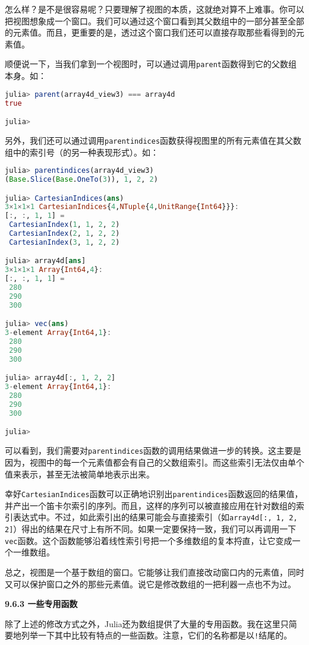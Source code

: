怎么样？是不是很容易呢？只要理解了视图的本质，这就绝对算不上难事。你可以把视图想象成一个窗口。我们可以通过这个窗口看到其父数组中的一部分甚至全部的元素值。而且，更重要的是，透过这个窗口我们还可以直接存取那些看得到的元素值。

顺便说一下，当我们拿到一个视图时，可以通过调用\verb|parent|函数得到它的父数组本身。如：
\begin{lstlisting}[language=julia]
julia> parent(array4d_view3) === array4d
true

julia> 
\end{lstlisting}

另外，我们还可以通过调用\verb|parentindices|函数获得视图里的所有元素值在其父数组中的索引号（的另一种表现形式）。如：

\begin{lstlisting}[language=julia]
julia> parentindices(array4d_view3)
(Base.Slice(Base.OneTo(3)), 1, 2, 2)

julia> CartesianIndices(ans)
3×1×1×1 CartesianIndices{4,NTuple{4,UnitRange{Int64}}}:
[:, :, 1, 1] =
 CartesianIndex(1, 1, 2, 2)
 CartesianIndex(2, 1, 2, 2)
 CartesianIndex(3, 1, 2, 2)

julia> array4d[ans]
3×1×1×1 Array{Int64,4}:
[:, :, 1, 1] =
 280
 290
 300

julia> vec(ans)
3-element Array{Int64,1}:
 280
 290
 300

julia> array4d[:, 1, 2, 2]
3-element Array{Int64,1}:
 280
 290
 300

julia> 
\end{lstlisting}

可以看到，我们需要对\verb|parentindices|函数的调用结果做进一步的转换。这主要是因为，视图中的每一个元素值都会有自己的父数组索引。而这些索引无法仅由单个值来表示，甚至无法被简单地表示出来。

幸好\verb|CartesianIndices|函数可以正确地识别出\verb|parentindices|函数返回的结果值，并产出一个笛卡尔索引的序列。而且，这样的序列可以被直接应用在针对数组的索引表达式中。不过，如此索引出的结果可能会与直接索引（如\verb|array4d[:, 1, 2, 2]|）得出的结果在尺寸上有所不同。如果一定要保持一致，我们可以再调用一下\verb|vec|函数。这个函数能够沿着线性索引号把一个多维数组的复本捋直，让它变成一个一维数组。

总之，视图是一个基于数组的窗口。它能够让我们直接改动窗口内的元素值，同时又可以保护窗口之外的那些元素值。说它是修改数组的一把利器一点也不为过。

\textbf{9.6.3 一些专用函数}

除了上述的修改方式之外，Julia还为数组提供了大量的专用函数。我在这里只简要地列举一下其中比较有特点的一些函数。注意，它们的名称都是以\verb|!|结尾的。

